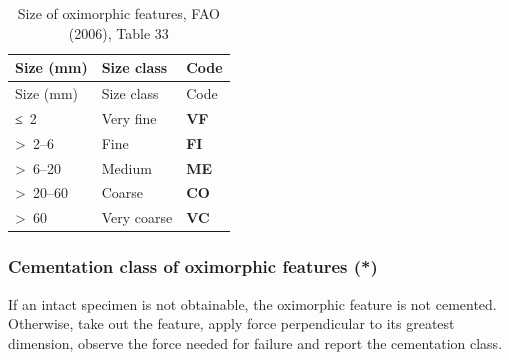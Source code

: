 \documentclass[
  letterpaper,
  DIV=11,
  numbers=noendperiod]{scrreprt}
\begin{document}
\begin{longtable}[]{@{}lll@{}}
\caption{Size of oximorphic features, FAO (2006), Table
33}\tabularnewline
\toprule()
Size (mm) & Size class & Code \\
\midrule()
\endfirsthead
\toprule()
Size (mm) & Size class & Code \\
\midrule()
\endhead
≤~2 & Very fine & \textbf{VF} \\
\textgreater~2--6 & Fine & \textbf{FI} \\
\textgreater~6--20 & Medium & \textbf{ME} \\
\textgreater~20--60 & Coarse & \textbf{CO} \\
\textgreater~60 & Very coarse & \textbf{VC} \\
\bottomrule()
\end{longtable}

\hypertarget{cementation-class-of-oximorphic-features}{%
\subsubsection{Cementation class of oximorphic features
(*)}\label{cementation-class-of-oximorphic-features}}

If an intact specimen is not obtainable, the oximorphic feature is not
cemented. Otherwise, take out the feature, apply force perpendicular to
its greatest dimension, observe the force needed for failure and report
the cementation class.
\end{document}
